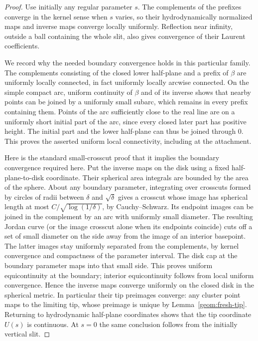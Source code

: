 \documentclass[11pt]{article}
\theoremstyle{definition}
\theoremstyle{remark}
\numberwithin{equation}{section}
\begin{document}
\begin{proof}
Use initially any regular parameter $s$.  The complements of the
prefixes converge in the kernel sense when $s$ varies, so their
hydrodynamically normalized maps and inverse maps converge locally
uniformly.  Reflection near infinity, outside a ball containing the
whole slit, also gives convergence of their Laurent coefficients.

We record why the needed boundary convergence holds in this particular
family.  The complements consisting of the closed lower half-plane
and a prefix of $\beta$ are uniformly locally connected, in fact
uniformly locally arcwise connected.  On the simple compact arc,
uniform continuity of $\beta$ and of its inverse shows that nearby
points can be joined by a uniformly small subarc, which remains in
every prefix containing them.  Points of the arc sufficiently close
to the real line are on a uniformly short initial part of the arc,
since every closed later part has positive height.  The initial part
and the lower half-plane can thus be joined through $0$.  This proves
the asserted uniform local connectivity, including at the attachment.

Here is the standard small-crosscut proof that it implies the boundary
convergence required here.  Put the inverse maps on the disk using a
fixed half-plane-to-disk coordinate.  Their spherical area integrals
are bounded by the area of the sphere.  About any boundary parameter,
integrating over crosscuts formed by circles of radii between
$\delta$ and $\sqrt\delta$ gives a crosscut whose image has spherical
length at most $C/\sqrt{\log(1/\delta)}$, by Cauchy--Schwarz.  Its
endpoint images can be joined in the complement by an arc with
uniformly small diameter.  The resulting Jordan curve (or the image
crosscut alone when its endpoints coincide) cuts off a set of small
diameter on the side away from the image of an interior basepoint.
The latter images stay uniformly separated from the complements, by
kernel convergence and compactness of the parameter interval.
The disk cap at the boundary parameter maps into that small side.
This proves uniform equicontinuity at the boundary; interior
equicontinuity follows from local uniform convergence.  Hence the
inverse maps converge uniformly on the closed disk in the spherical
metric.  In particular their tip preimages converge: any cluster
point maps to the limiting tip, whose preimage is unique by
Lemma~\ref{geom:fresh-tip}.  Returning to hydrodynamic half-plane
coordinates shows that the tip coordinate $U(s)$ is continuous.
At $s=0$ the same conclusion follows from the initially vertical slit.


\end{proof}
\end{document}
